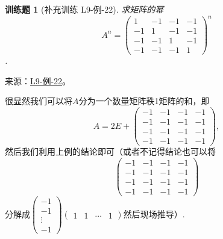 \documentclass[12pt,fontset=fandol]{ctexart}
\newtheorem{exercise}{训练题}[section]
\begin{document}
\begin{exercise}[补充训练 L9-例-22]\label{prob:L9-例-22}
求矩阵的幂
\[A^n=\begin{pmatrix}
                      1  & -1 & -1 & -1 \\
                      -1 & 1  & -1 & -1 \\
                      -1 & -1 & 1  & -1 \\
                      -1 & -1 & -1 & 1
                  \end{pmatrix}^n\]
.
\end{exercise}
\noindent 来源：\href{https://github.com/yhwu-is/Linear-Algebra-Left-Undone/blob/new/%E8%AE%B2%E4%B9%89/%E4%B8%93%E9%A2%98/9%20%E7%9F%A9%E9%98%B5%E8%BF%90%E7%AE%97%E8%BF%9B%E9%98%B6.tex}{L9-例-22}。
\begin{solve}
很显然我们可以将$A$分为一个数量矩阵秩1矩阵的和，即\[A=2E+\begin{pmatrix}
                      -1 & -1 & -1 & -1 \\
                      -1 & -1 & -1 & -1 \\
                      -1 & -1 & -1 & -1 \\
                      -1 & -1 & -1 & -1
                  \end{pmatrix},\]
              然后我们利用上例的结论即可（或者不记得结论也可以将
\[\begin{pmatrix}
                      -1 & -1 & -1 & -1 \\
                      -1 & -1 & -1 & -1 \\
                      -1 & -1 & -1 & -1 \\
                      -1 & -1 & -1 & -1
                  \end{pmatrix}\]
分解成$\begin{pmatrix}
                      -1 \\ -1 \\ \vdots \\ -1
                  \end{pmatrix}\begin{pmatrix}
                      1 & 1 & \cdots & 1
                  \end{pmatrix}$然后现场推导）.
\end{solve}
\end{document}
